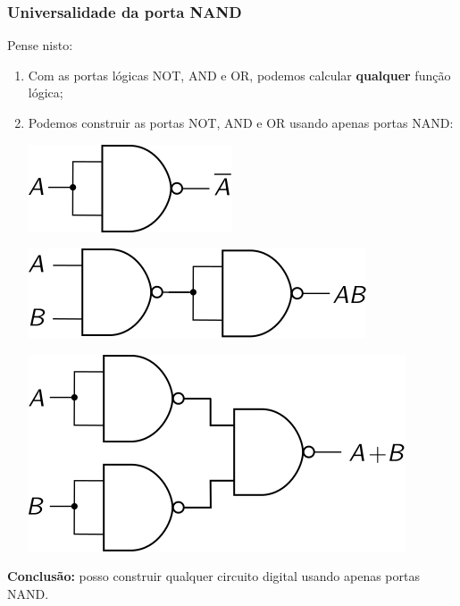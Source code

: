 \documentclass{beamer}
\begin{document}
\begin{frame}
\frametitle{Universalidade da porta NAND}

Pense nisto:
\begin{enumerate}
\item Com as portas lógicas NOT, AND e OR, podemos calcular
\textbf{qualquer} função lógica;
\pause
\item Podemos construir as portas NOT, AND e OR usando apenas
portas NAND:
\begin{center}
\begin{minipage}{0.2\textwidth}
\includegraphics[scale=0.9]{images/nand_univ1_resp}
\end{minipage}
\hspace{8ex}
\begin{minipage}{0.4\textwidth}
\includegraphics[scale=0.9]{images/nand_univ2_resp}
\end{minipage}

\vspace{12pt}

\includegraphics[scale=0.9]{images/nand_univ3_resp}
\end{center}
\end{enumerate}

\pause

\textbf{Conclusão:} posso construir qualquer circuito digital
usando apenas portas NAND.
\end{frame}
\end{document}
